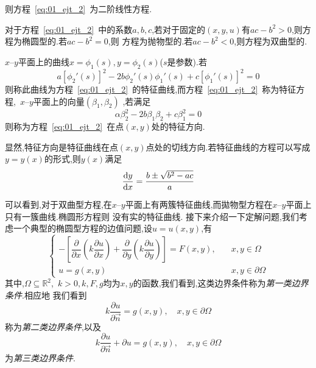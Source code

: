 则方程~\eqref{eq:01_ejt_2}~为二阶线性方程.\par
对于方程~\eqref{eq:01_ejt_2}~中的系数$a,b,c$,若对于固定的$(x,y,u)$有$ac-b^2>0$,则方程为椭圆型的.若$ac-b^2=0$,则
方程为抛物型的.若$ac-b^2<0$,则方程为双曲型的.\par
$x$--$y$平面上的曲线$x=\phi_1(s),y=\phi_2(s)$($s$是参数).若
\begin{equation}
 a[\phi_2'(s)]^2-2b\phi_2'(s)\phi_1'(s)+c[\phi_1'(s)]^2=0
\end{equation}
则称此曲线为方程~\eqref{eq:01_ejt_2}~的特征曲线,而方程~\eqref{eq:01_ejt_2}~称为特征方程,~$x$--$y$平面上的向量$(\beta_1,\beta_2)$
,若满足
\begin{equation}
 \alpha\beta_2^2-2b\beta_1\beta_2+c\beta_1^2=0
\end{equation}
则称为方程~\eqref{eq:01_ejt_2}~在点$(x,y)$处的特征方向.\par
显然,特征方向是特征曲线在点$(x,y)$点处的切线方向.若特征曲线的方程可以写成$y=y(x)$的形式,则$y(x)$满足
\begin{equation}
 \dfrac{\mathrm{d} y}{\mathrm{d} x}=\dfrac{b\pm\sqrt{b^2-ac}}{a}
\end{equation}\par
可以看到,对于双曲型方程,在$x$--$y$平面上有两簇特征曲线,而拋物型方程在$x$--$y$平面上只有一簇曲线.椭圆形方程则
没有实的特征曲线.
接下来介绍一下定解问题,我们考虑一个典型的椭圆型方程的边值问题,设$u=u(x,y)$,有
\begin{equation}
 \begin{cases}
  -\left[\dfrac{\partial}{\partial x}\left(k\dfrac{\partial u}{\partial x}\right)+
  \dfrac{\partial}{\partial y}\left(k\dfrac{\partial u}{\partial y}\right)\right]=F(x,y)
  ,&	\quad x,y \in \Omega \\[1em]
  u=g(x,y)	& \quad	x,y\in \partial \Omega
 \end{cases}
\end{equation}
其中,$\Omega\subseteq\mathbb{R}^2$,~$k>0,k,F,g$均为$x,y$的函数,我们看到,这类边界条件称为\emph{第一类边界条件}.相应地
我们看到
\begin{equation}
 k\dfrac{\partial u}{\partial \vec{n}}=g(x,y),\quad x,y\in\partial\Omega
\end{equation}
称为\emph{第二类边界条件},以及
\begin{equation}
 k\dfrac{\partial u}{\partial \vec{n}}+\partial u=g(x,y),\quad x,y\in\partial\Omega
\end{equation}
为\emph{第三类边界条件}.
